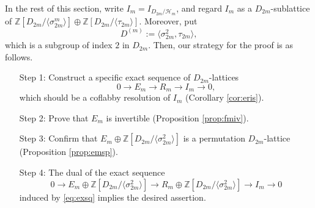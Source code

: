\documentclass[12pt]{amsart}
\theoremstyle{plain}
\theoremstyle{definition}
\numberwithin{thm}{section}
\numberwithin{equation}{section}
\newcommand{\Z}{\mathbb{Z}}
\newcommand{\cH}{\mathcal{H}}
\begin{document}
In the rest of this section, write $I_{m}=I_{D_{2m}/\cH_{m}}$, and regard $I_{m}$ as a $D_{2m}$-sublattice of $\Z[D_{2m}/\langle \sigma_{2m}^{m}\rangle]\oplus \Z[D_{2m}/\langle \tau_{2m}\rangle]$. Moreover, put
\begin{equation*}
D^{(m)}:=\langle \sigma_{2m}^{2},\tau_{2m}\rangle, 
\end{equation*}
which is a subgroup of index $2$ in $D_{2m}$. Then, our strategy for the proof is as follows. 
\begin{enumerate}
\item[Step 1:\hspace{-20pt}] \hspace{20pt}Construct a specific exact sequence of $D_{2m}$-lattices
\begin{equation}\label{eq:exsq}
    0\rightarrow E_{m}\rightarrow R_{m}\rightarrow I_{m}\rightarrow 0,
\end{equation}
 \hspace{20pt} which should be a coflabby resolution of $I_{m}$ (Corollary \ref{cor:eris}). 
\item[Step 2:\hspace{-20pt}] \hspace{20pt} Prove that $E_{m}$ is invertible (Proposition \ref{prop:fmiv}). 
\item[Step 3:\hspace{-20pt}] \hspace{20pt} Confirm that $E_{m}\oplus \Z[D_{2m}/\langle \sigma_{2m}^{2} \rangle]$ is a permutation $D_{2m}$-lattice (Proposition \ref{prop:emsp}).
\item[Step 4:\hspace{-20pt}] \hspace{20pt} The dual of the exact sequence 
    \begin{equation*}
        0\rightarrow E_{m}\oplus \Z[D_{2m}/\langle \sigma_{2m}^{2}\rangle]\rightarrow R_{m}\oplus \Z[D_{2m}/\langle \sigma_{2m}^{2}\rangle] \rightarrow I_{m}\rightarrow 0
\end{equation*}
 \hspace{20pt} induced by \eqref{eq:exsq} implies the desired assertion. 
\end{enumerate}
\end{document}
